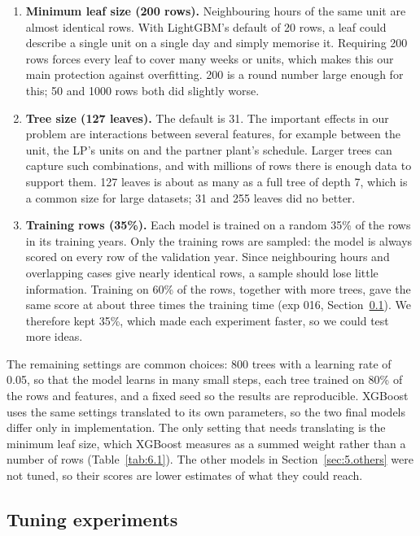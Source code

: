 \begin{enumerate}
  \item \textbf{Minimum leaf size (200 rows).} Neighbouring hours of the same unit are almost identical rows. With LightGBM's default of 20 rows, a leaf could describe a single unit on a single day and simply memorise it. Requiring 200 rows forces every leaf to cover many weeks or units, which makes this our main protection against overfitting. 200 is a round number large enough for this; 50 and 1000 rows both did slightly worse.

  \item \textbf{Tree size (127 leaves).} The default is 31. The important effects in our problem are interactions between several features, for example between the unit, the LP's units on and the partner plant's schedule. Larger trees can capture such combinations, and with millions of rows there is enough data to support them. 127 leaves is about as many as a full tree of depth 7, which is a common size for large datasets; 31 and 255 leaves did no better.

  \item \textbf{Training rows (35\%).} Each model is trained on a random 35\% of the rows in its training years. Only the training rows are sampled: the model is always scored on every row of the validation year. Since neighbouring hours and overlapping cases give nearly identical rows, a sample should lose little information. Training on 60\% of the rows, together with more trees, gave the same score at about three times the training time (exp 016, Section~\ref{sec:6.tuning}). We therefore kept 35\%, which made each experiment faster, so we could test more ideas.
\end{enumerate}

The remaining settings are common choices: 800 trees with a learning rate of 0.05, so that the model learns in many small steps, each tree trained on 80\% of the rows and features, and a fixed seed so the results are reproducible. XGBoost uses the same settings translated to its own parameters, so the two final models differ only in implementation. The only setting that needs translating is the minimum leaf size, which XGBoost measures as a summed weight rather than a number of rows (Table~\ref{tab:6.1}). The other models in Section~\ref{sec:5.others} were not tuned, so their scores are lower estimates of what they could reach.

\subsection{Tuning experiments}\label{sec:6.tuning}

